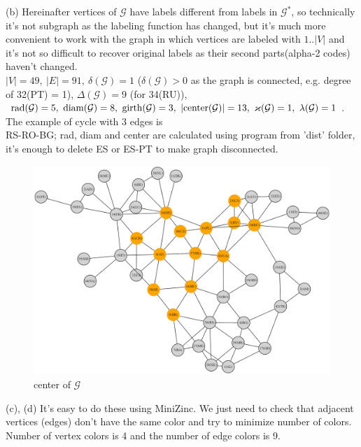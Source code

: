 \documentclass{article}
\begin{document}
	(b) Hereinafter vertices of $\mathcal{G}$ have labels different from labels in $\mathcal{G}^*$, so technically it's not subgraph as the labeling function has changed, but it's much more convenient to work with the graph in which vertices are labeled with $1..|V|$ and it's not so difficult to recover original labels as their second parts(alpha-2 codes) haven't changed.
	\\$|V| = 49,~ |E| = 91,~ \delta(\mathcal{G}) = 1$ ($\delta(\mathcal{G}) > 0$ as the graph is connected, e.g. degree of 32(PT) = 1), $\Delta(\mathcal{G}) = 9$ (for 34(RU)), $\textmd{rad}(\mathcal{G}) = 5,~\textmd{diam}(\mathcal{G}) = 8,~\textmd{girth}(\mathcal{G}) = 3,~|\textmd{center}(\mathcal{G})| = 13,~\varkappa(\mathcal{G}) = 1,~\lambda(\mathcal{G}) = 1$. The example of cycle with 3 edges is\\ RS-RO-BG; rad, diam and center are calculated using program from 'dist' folder, it's enough to delete ES or ES-PT to make graph disconnected.
	\begin{figure}[h]
		\centering
		\includegraphics[width=1\textwidth]{center.png}
		\caption{center of $\mathcal{G}$ }
	\end{figure}\newpage
	(c), (d) It's easy to do these using MiniZinc. We just need to check that adjacent vertices (edges) don't have the same color and try to minimize number of colors. Number of vertex colors is 4 and the number of edge colors is 9.
\end{document}
